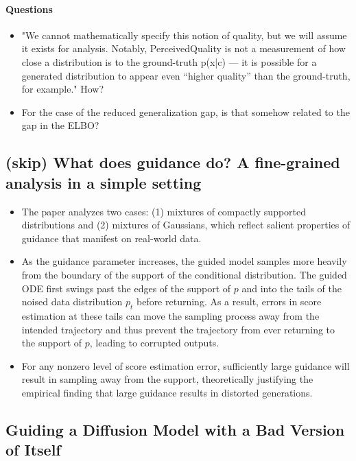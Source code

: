 \documentclass{article}
\begin{document}
\paragraph{Questions}
\begin{itemize}
    \item "We cannot mathematically specify this notion of quality, but we will assume it exists for analysis. Notably, PerceivedQuality is not a measurement of how close a distribution is to the ground-truth p(x|c) — it is possible for a generated distribution to appear even “higher quality” than the ground-truth, for example." How? 
    \item For the case of the reduced generalization gap, is that somehow related to the gap in the ELBO?
\end{itemize}

\subsection{(skip) What does guidance do? A fine-grained analysis in a simple setting}

\begin{itemize}
    \item The paper analyzes two cases: (1) mixtures of compactly supported distributions and (2) mixtures of Gaussians, which reflect salient properties of guidance that manifest on real-world data.
    \item As the guidance parameter increases, the guided model samples more heavily from the boundary of the support of the conditional distribution. The guided ODE first swings past the edges of the support of $p$ and into the tails of the noised data distribution $p_t$ before returning. As a result, errors in score estimation at these tails can move the sampling process away from the intended trajectory and thus prevent the trajectory from ever returning to the support of $p$, leading to corrupted outputs.
    \item For any nonzero level of score estimation error, sufficiently large guidance will result in sampling away from the support, theoretically justifying the empirical finding that large guidance results in distorted generations.
\end{itemize}

\subsection{Guiding a Diffusion Model with a Bad Version of Itself}
\end{document}

